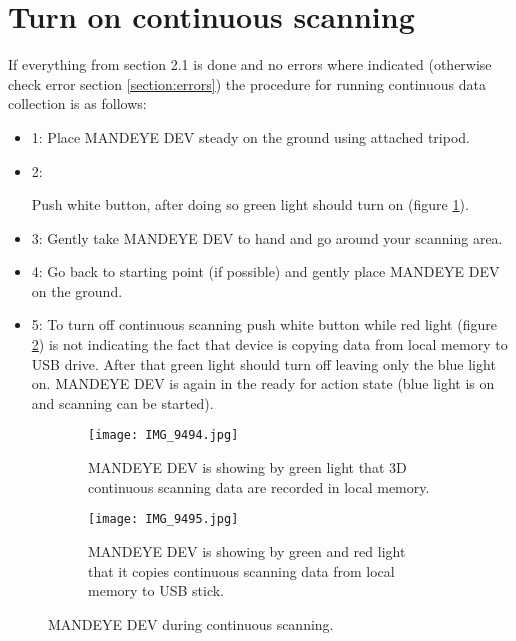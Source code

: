 \section{Turn on continuous scanning}
If everything from section 2.1 is done and no errors where indicated (otherwise check error section \ref{section:errors}) the procedure for running continuous data collection is as follows:
\begin{itemize}
	\item 1: Place MANDEYE DEV steady on the ground using attached tripod.
	\item 2: \begin{minipage}[t]{\linewidth}
		\raggedright
		\medskip	
	\end{minipage}
	Push white button, after doing so green light should turn on (figure \ref{fig:m31}). 
	\item 3: Gently take MANDEYE DEV to hand and go around your scanning area.
	\item 4: Go back to starting point (if possible) and gently place MANDEYE DEV on the ground.
	\item 5: To turn off continuous scanning push white button while red light (figure \ref{fig:m32}) is not indicating the fact that device is copying data from local memory to USB drive. After that green light should turn off leaving only the blue light on. MANDEYE DEV is again in the ready for action state (blue light is on and scanning can be started).
\end{itemize}
\begin{figure}[H]
	\centering
	\begin{subfigure}[b]{0.45\textwidth}
		\centering
		\texttt{[image: IMG\_9494.jpg]}
		\caption{MANDEYE DEV is showing by green light that 3D continuous scanning data are recorded in local memory.}
		\label{fig:m31}
	\end{subfigure}
	\hfill
	\begin{subfigure}[b]{0.45\textwidth}
		\centering
		\texttt{[image: IMG\_9495.jpg]}
		\caption{MANDEYE DEV is showing by green and red light that it copies continuous scanning data from local memory to USB stick.}
		\label{fig:m32}
	\end{subfigure}
	\caption{MANDEYE DEV during continuous scanning.}
	\label{fig:mandeye_hardware3}
\end{figure}

